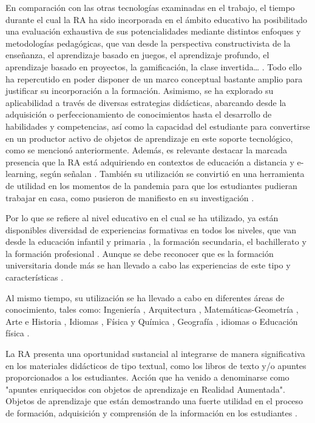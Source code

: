 \documentclass[spanish]{textolivre}
\begin{document}
En comparación con las otras tecnologías examinadas en el trabajo, el tiempo durante el cual la RA ha sido incorporada en el ámbito educativo ha posibilitado una evaluación exhaustiva de sus potencialidades mediante distintos enfoques y metodologías pedagógicas, que van desde la perspectiva constructivista de la enseñanza, el aprendizaje basado en juegos, el aprendizaje profundo, el aprendizaje basado en proyectos, la gamificación, la clase invertida… \cite{llorentecejudo2023relationship}. Todo ello ha repercutido en poder disponer de un marco conceptual bastante amplio para justificar su incorporación a la formación. Asimismo, se ha explorado su aplicabilidad a través de diversas estrategias didácticas, abarcando desde la adquisición o perfeccionamiento de conocimientos hasta el desarrollo de habilidades y competencias, así como la capacidad del estudiante para convertirse en un productor activo de objetos de aprendizaje en este soporte tecnológico, como se mencionó anteriormente. Además, es relevante destacar la marcada presencia que la RA está adquiriendo en contextos de educación a distancia y e-learning, según señalan \textcite{Elmira022effect}. También su utilización se convirtió en una herramienta de utilidad en los momentos de la pandemia para que los estudiantes pudieran trabajar en casa, como pusieron de manifiesto en su investigación \textcite{uriarteportillo2023comparison}.

Por lo que se refiere al nivel educativo en el cual se ha utilizado, ya están disponibles diversidad de experiencias formativas en todos los niveles, que van desde la educación infantil y primaria \cite{hurtadomazeyra2023digital}, la formación secundaria, el bachillerato y la formación profesional \cite{delcerrovelazquez2017realidad}. Aunque se debe reconocer que es la formación universitaria donde más se han llevado a cabo las experiencias de este tipo y características \cite{Elmira022effect}.

Al mismo tiempo, su utilización se ha llevado a cabo en diferentes áreas de conocimiento, tales como: Ingeniería \cite{takrouri2022ar}, Arquitectura \cite{fonseca2016motivacion}, Matemáticas-Geometría \cite{ovalle2020realidad}, Arte e Historia \cite{cabero2020use}, Idiomas \cite{marrahi2023effect}, Física y Química \cite{tarng2022application}, Geografía \cite{bermejo_2023}, idiomas \cite{reyesruiz2022realidad} o Educación física \cite{suprapto2023bibliometric}.

La RA presenta una oportunidad sustancial al integrarse de manera significativa en los materiales didácticos de tipo textual, como los libros de texto y/o apuntes proporcionados a los estudiantes. Acción que ha venido a denominarse como "apuntes enriquecidos con objetos de aprendizaje en Realidad Aumentada". Objetos de aprendizaje que están demostrando una fuerte utilidad en el proceso de formación, adquisición y comprensión de la información en los estudiantes \cite{paredesvelastegui2018augmented,chen2021continuance}.
\end{document}
